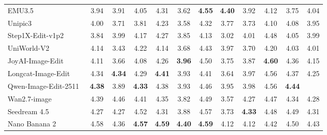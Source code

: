 \documentclass{llmxive}
\begin{document}
\begin{table}[t]
{\begin{tabular}{l|cccccccccc|c}
            EMU3.5~\cite{cui2025emu3}
            & 3.94 & 3.91 & 4.05 & 4.31 & 3.62 & \textbf{4.55} & \textbf{4.40} & 3.92 & 4.12 & 3.75
            & \cellcolor[HTML]{C8C8C8}4.04 \\

            Unipic3~\cite{wei2026skywork}
            & 4.00 & 3.71 & 3.81 & 4.23 & 3.58 & 4.32 & 3.77 & 3.73 & 4.10 & 4.08
            & \cellcolor[HTML]{C8C8C8}3.95 \\

            Step1X-Edit-v1p2~\cite{liu2025step1x}
            & 3.84 & 3.99 & 4.17 & 4.27 & 3.85 & 4.13 & 3.02 & 4.01 & 4.48 & 4.05
            & \cellcolor[HTML]{C8C8C8}3.99 \\
            
            UniWorld-V2~\cite{li2025uniworld}
            & 4.14 & 3.43 & 4.22 & 4.14 & 3.68 & 4.43 & 3.97 & 3.70 & 4.20 & 4.03
            & \cellcolor[HTML]{C8C8C8}4.01 \\

            JoyAI-Image-Edit~\cite{joyaiimage2026}
            & 4.11 & 3.66 & 4.08 & 4.26 & \textbf{3.96} & 4.50 & 3.75 & 3.87 & \textbf{4.60} & 4.36
            & \cellcolor[HTML]{C8C8C8}4.15 \\

            Longcat-Image-Edit~\cite{team2025longcat}
            & 4.34 & \textbf{4.34} & 4.29 & \textbf{4.41} &  3.93  & 4.41 & 3.64 & 3.97 &  4.56  & 4.37
            & \cellcolor[HTML]{C8C8C8}4.25 \\

            Qwen-Image-Edit-2511~\cite{wu2025qwen}
            & \textbf{4.38} & 3.89 & \textbf{4.33} & 4.38 & 3.93 & 4.46 & 3.95 & 3.98 &  4.56  & \textbf{4.44}
            & \cellcolor[HTML]{C8C8C8}{\textbf{4.26}} \\


            \midrule

            Wan2.7-image~\cite{nanobananapro}
            & 4.39 & 4.46 & 4.41 & 4.35 & 3.82 & 4.49 & 3.57 & 4.27 & 4.47 & 4.34
            & \cellcolor[HTML]{C8C8C8} 4.28  \\

            Seedream 4.5~\cite{seedream2025seedream}
            & 4.27 & 4.27 & 4.52 & 4.31 & 3.88 & 4.57 & 3.73 & \textbf{4.33} & 4.48 & 4.49
            & \cellcolor[HTML]{C8C8C8}4.31 \\

            
            Nano Banana 2~\cite{gemini3pro}
            & 4.58 & 4.36 & \textbf{4.57} & \textbf{4.59} & \textbf{4.40} & \textbf{4.59} & 4.12 & 4.12 & 4.42 & 4.50
            &  \cellcolor[HTML]{C8C8C8}4.43  \\
            

\end{tabular}}
\end{table}
\end{document}
